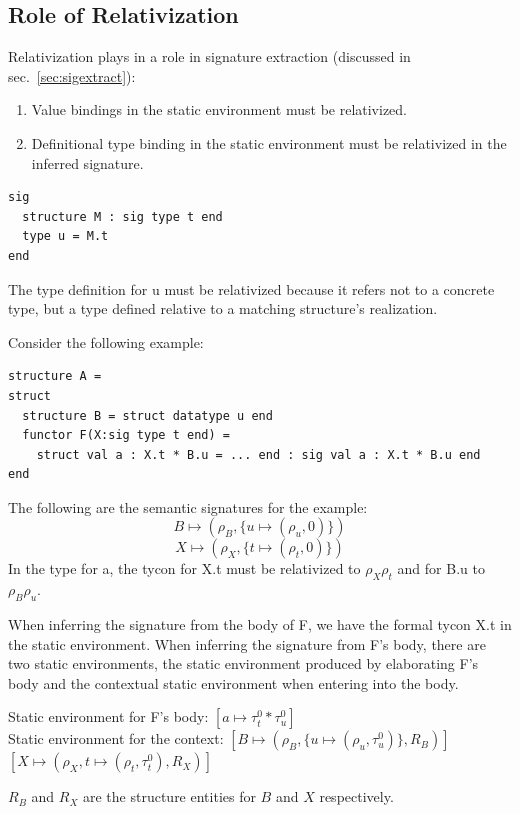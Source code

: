 \documentclass[9pt,nocopyrightspace, fleqn]{sigplanconf}
\begin{document}
\subsection{Role of Relativization}
Relativization plays in a role in signature extraction (discussed in sec.~\ref{sec:sigextract}):
\begin{enumerate}
\item Value bindings in the static environment must be relativized. 
\item Definitional type binding in the static environment must be relativized in the inferred signature. 
\end{enumerate}
        
\begin{lstlisting}
sig
  structure M : sig type t end
  type u = M.t 
end
\end{lstlisting}

\noindent The type definition for u must be relativized because it refers not to a concrete type, but a type defined relative to a matching structure's realization.

Consider the following example:
\begin{lstlisting}
structure A =
struct
  structure B = struct datatype u end
  functor F(X:sig type t end) = 
    struct val a : X.t * B.u = ... end : sig val a : X.t * B.u end
end
\end{lstlisting}

The following are the semantic signatures for the example:
\[B \mapsto (\rho_B, \{u \mapsto (\rho_u, 0)\})\]
\[X \mapsto (\rho_X, \{t \mapsto (\rho_t, 0)\})\]
In the type for a, the tycon for X.t must be relativized to $\rho_X\rho_t$ and for B.u to $\rho_B\rho_u$. 

When inferring the signature from the body of F, we have the formal tycon X.t in the static environment. When inferring the signature from F's body, there are two static environments, the static environment produced by elaborating F's body and the contextual static environment when entering into the body. 

Static environment for F's body: $[a \mapsto \tau_t^0 * \tau_u^0 ]$ \\
Static environment for the context: $[B \mapsto (\rho_B, \{u \mapsto (\rho_u, \tau_u^0)\}, R_B)]$\\
                 $[X \mapsto (\rho_X, {t \mapsto (\rho_t, \tau_t^0)}, R_X)]$

$R_B$ and $R_X$ are the structure entities for $B$ and $X$ respectively. 
\end{document}
